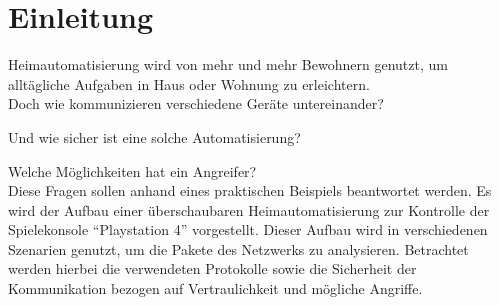 \newpage
\section{Einleitung}\label{sec:einleitung}
Heimautomatisierung wird von mehr und mehr Bewohnern genutzt,
um alltägliche Aufgaben in Haus oder Wohnung zu erleichtern.\\

Doch wie kommunizieren verschiedene Geräte untereinander?

Und wie sicher ist eine solche Automatisierung?

Welche Möglichkeiten hat ein Angreifer?\\


Diese Fragen sollen anhand eines praktischen Beispiels beantwortet werden.
Es wird der Aufbau einer überschaubaren Heimautomatisierung zur Kontrolle der Spielekonsole \enquote{Playstation 4} vorgestellt.
Dieser Aufbau wird in verschiedenen Szenarien genutzt,
 um die Pakete des Netzwerks zu analysieren.
Betrachtet werden hierbei die verwendeten Protokolle sowie die Sicherheit der Kommunikation bezogen auf Vertraulichkeit und mögliche Angriffe.

